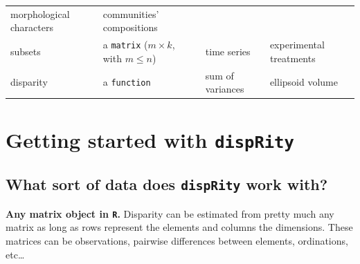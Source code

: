 \documentclass[]{book}
\theoremstyle{definition}
\theoremstyle{definition}
\theoremstyle{definition}
\theoremstyle{remark}
\begin{document}
\begin{longtable}[]{@{}llll@{}}
\begin{minipage}[t]{0.23\columnwidth}
morphological characters\strut
\end{minipage} & \begin{minipage}[t]{0.17\columnwidth}\raggedright\strut
communities' compositions\strut
\end{minipage}\tabularnewline
\begin{minipage}[t]{0.20\columnwidth}\raggedright\strut
subsets\strut
\end{minipage} & \begin{minipage}[t]{0.20\columnwidth}\raggedright\strut
a \texttt{matrix} (\(m \times k\), with \(m \leq n\))\strut
\end{minipage} & \begin{minipage}[t]{0.23\columnwidth}\raggedright\strut
time series\strut
\end{minipage} & \begin{minipage}[t]{0.17\columnwidth}\raggedright\strut
experimental treatments\strut
\end{minipage}\tabularnewline
\begin{minipage}[t]{0.20\columnwidth}\raggedright\strut
disparity\strut
\end{minipage} & \begin{minipage}[t]{0.20\columnwidth}\raggedright\strut
a \texttt{function}\strut
\end{minipage} & \begin{minipage}[t]{0.23\columnwidth}\raggedright\strut
sum of variances\strut
\end{minipage} & \begin{minipage}[t]{0.17\columnwidth}\raggedright\strut
ellipsoid volume\strut
\end{minipage}\tabularnewline
\bottomrule
\end{longtable}

\chapter{\texorpdfstring{Getting started with
\texttt{dispRity}}{Getting started with dispRity}}\label{getting-started-with-disprity}

\section{\texorpdfstring{What sort of data does \texttt{dispRity} work
with?}{What sort of data does dispRity work with?}}\label{what-sort-of-data-does-disprity-work-with}

\textbf{Any matrix object in \texttt{R}.} Disparity can be estimated
from pretty much any matrix as long as rows represent the elements and
columns the dimensions. These matrices can be observations, pairwise
differences between elements, ordinations, etc\ldots{}
\end{document}

